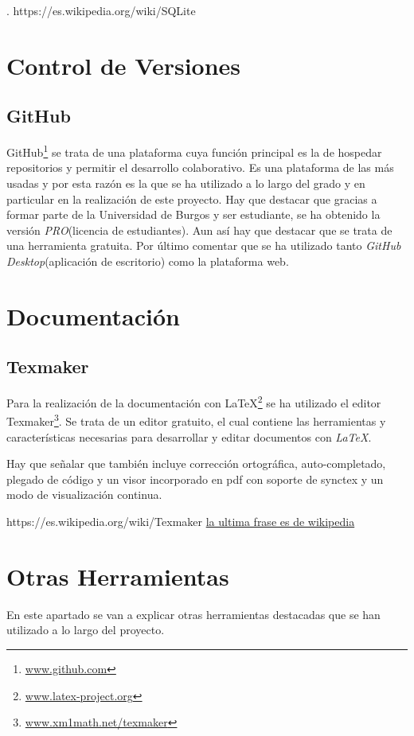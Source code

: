 \cite{sqlite}. https://es.wikipedia.org/wiki/SQLite



\section{Control de Versiones}\label{control_de_versiones}
\subsection{GitHub}\label{gitHub}
GitHub\footnote{\href {https://github.com/}{www.github.com}} se trata de una plataforma cuya función principal es la de hospedar repositorios y permitir el desarrollo colaborativo.
Es una plataforma de las más usadas y por esta razón es la que se ha utilizado a lo largo del grado y en particular en la realización de este proyecto. Hay que destacar que gracias a formar parte de la Universidad de Burgos y ser estudiante, se ha obtenido la versión \emph{PRO}(licencia de estudiantes). Aun así hay que destacar que se trata de una herramienta gratuita.
Por último comentar que se ha utilizado tanto \emph{GitHub Desktop}(aplicación de escritorio) como la plataforma web.

\cite{github}


\section{Documentación}\label{documentacion}

\subsection{Texmaker}\label{texmaker}
Para la realización de la documentación con LaTeX\footnote{\href {https://www.latex-project.org/}{www.latex-project.org}} se ha utilizado el editor Texmaker\footnote{\href {https://www.xm1math.net/texmaker/}{www.xm1math.net/texmaker}}. Se trata de un editor gratuito, el cual contiene las herramientas y características necesarias para desarrollar y editar documentos con \emph{LaTeX}.

Hay que señalar que también incluye corrección ortográfica, auto-completado, plegado de código y un visor incorporado en pdf con soporte de synctex y un modo de visualización continua. 

\cite{texmaker} https://es.wikipedia.org/wiki/Texmaker
\href{}{la ultima frase es de wikipedia}

\section{Otras Herramientas}\label{otras_herramientas}
En este apartado se van a explicar otras herramientas destacadas que se han utilizado a lo largo del proyecto.

